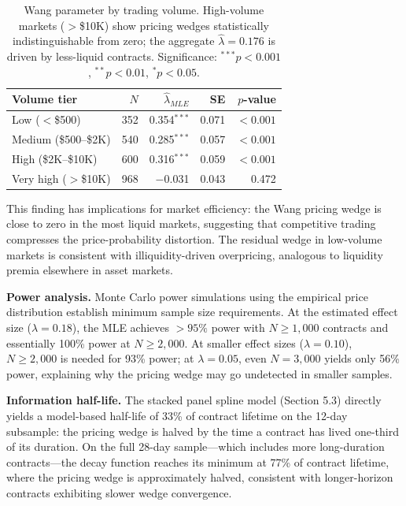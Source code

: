 \documentclass[12pt,a4paper]{article}
\begin{document}
\begin{table}[H]
\centering
\small
\caption{Wang parameter by trading volume. High-volume markets ($>$\$10K) show pricing wedges statistically indistinguishable from zero; the aggregate $\hat{\lambda} = 0.176$ is driven by less-liquid contracts. Significance: $^{***}p<0.001$, $^{**}p<0.01$, $^{*}p<0.05$.}
\begin{tabular}{lrrrr}
\toprule
Volume tier & $N$ & $\hat{\lambda}_{MLE}$ & SE & $p$-value \\
\midrule
Low ($<$\$500) & 352 & 0.354$^{***}$ & 0.071 & $<0.001$ \\
Medium (\$500--\$2K) & 540 & 0.285$^{***}$ & 0.057 & $<0.001$ \\
High (\$2K--\$10K) & 600 & 0.316$^{***}$ & 0.059 & $<0.001$ \\
Very high ($>$\$10K) & 968 & $-$0.031 & 0.043 & 0.472 \\
\bottomrule
\end{tabular}
\end{table}

This finding has implications for market efficiency: the Wang pricing
wedge is close to zero in the most liquid markets, suggesting
that competitive trading
compresses the price-probability distortion.
The residual wedge in low-volume markets is consistent with
illiquidity-driven overpricing, analogous to liquidity premia elsewhere
in asset markets.

\textbf{Power analysis.} Monte Carlo power simulations using the
empirical price distribution establish minimum sample size requirements.
At the estimated effect size (\(\lambda = 0.18\)), the MLE achieves
\(>95\%\) power with \(N \geq 1{,}000\) contracts and essentially 100\%
power at \(N \geq 2{,}000\). At smaller effect sizes
(\(\lambda = 0.10\)), \(N \geq 2{,}000\) is needed for 93\% power; at
\(\lambda = 0.05\), even \(N = 3{,}000\) yields only 56\% power,
explaining why the pricing wedge may go undetected in smaller samples.

\textbf{Information half-life.} The stacked panel spline model (Section
5.3) directly yields a model-based half-life of 33\% of contract
lifetime on the 12-day subsample: the pricing wedge is halved by the
time a contract has lived one-third of its duration. On the full 28-day
sample---which includes more long-duration contracts---the decay
function reaches its minimum at 77\% of contract lifetime, where the
pricing wedge is approximately halved, consistent with longer-horizon
contracts exhibiting slower wedge convergence.
\end{document}
